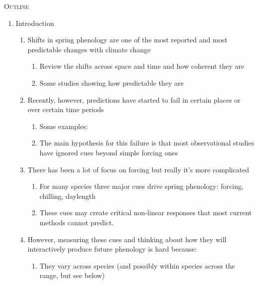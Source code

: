 \documentclass[11pt,letterpaper]{article}
\renewcommand{\section}[1]{%
\bigskip
\begin{center}
\begin{Large}
\normalfont\scshape #1
\medskip
\end{Large}
\end{center}}
\begin{document}
\section{Outline}
\begin{enumerate}
\item Introduction 
\begin{enumerate}
\item Shifts in spring phenology are one of the most reported and most predictable changes with climate change
\begin{enumerate}
\item Review the shifts across space and time and how coherent they are
\item Some studies showing how predictable they are \citep{Schwartz:1997nn,Menzel2003a,Menzel:2006sq,delpierre2009,Ellwood2012,jochner2013,hereford2017}
\end{enumerate}
\item Recently, however, predictions have started to fail in certain places or over certain time periods
\begin{enumerate}
\item Some examples: \citet{yu2010,fu2015} %
\item The main hypothesis for this failure is that  most observational studies have ignored cues beyond simple forcing ones \citep{chuine2016}
\end{enumerate}
\item There has been a lot of focus on forcing but really it's more complicated
\begin{enumerate}
\item For many species three major cues drive spring phenology: forcing, chilling, daylength
\item These cues may create critical non-linear responses that most current methods cannot predict.
\end{enumerate}
\item However, measuring these cues and thinking about how they will interactively produce future phenology is hard because:
\begin{enumerate}
\item They vary across species (and possibly within species across the range, but see below) \citep{vitasse2009,harrington2015} 

\end{enumerate}
\end{enumerate}
\end{enumerate}
\end{document}
